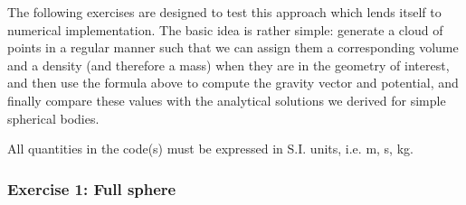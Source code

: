 The following exercises are designed to test this approach which lends itself to 
numerical implementation. 
The basic idea is rather simple: generate a cloud of points in a regular manner such that 
we can assign them a corresponding volume and a density (and therefore a mass)
when they are in the geometry of interest, 
and then use the formula above to compute the gravity vector and potential, and finally 
compare these values with the analytical solutions we derived for simple spherical bodies. 


{\color{red} All quantities in the code(s) must be expressed in S.I. units, i.e. \si{\metre}, \si{\second}, \si{\kilo\gram}. }



\subsubsection*{Exercise 1: Full sphere}

